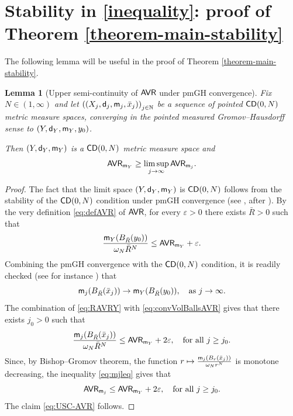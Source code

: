 \documentclass[11pt, reqno]{amsart}
\newtheorem{lemma}{Lemma}[section]
\numberwithin{equation}{section}
\begin{document}
		

 \section{Stability in \eqref{inequality}: proof of Theorem \ref{theorem-main-stability}}
	
	The following lemma will be useful in the proof of Theorem \ref{theorem-main-stability}.
	
	\begin{lemma}[Upper semi-continuity of ${\sf AVR}$ under pmGH convergence] \label{lem:USC-AVR} Fix $N\in (1,\infty)$ and let $\left((X_j, {\sf d}_j, {\sf m}_j, \bar{x}_j)\right)_{j\in \mathbb{N}}$ be a sequence of pointed  ${\sf CD}(0,N)$ metric measure  spaces, converging in the pointed measured Gromov--Hausdorff sense to $(Y, {\sf d}_{Y}, {\sf m}_{Y}, y_{0})$. 
	
	Then  $(Y, {\sf d}_{Y}, {\sf m}_{Y})$ is a ${\sf CD}(0,N)$ metric measure  space and 
	\begin{equation}\label{eq:USC-AVR}
	{\sf AVR}_{{\sf m}_Y} \geq \limsup_{j\to \infty} {\sf AVR}_{{\sf m}_j}. 
	\end{equation}
	\end{lemma}

	\begin{proof} 
	The fact that the limit space $(Y, {\sf d}_{Y}, {\sf m}_{Y})$ is ${\sf CD}(0,N)$ follows from the stability of the ${\sf CD}(0,N)$ condition under pmGH convergence (see \cite[Theorem 29.25]{Villani}, after \cite{Sturm-2, LV}).    
	By the very definition \eqref{eq:defAVR} of ${\sf AVR}$, for every $\varepsilon>0$ there exists $\bar{R}>0$ such that
	\begin{equation}\label{eq:RAVRY}
	\frac{{\sf m}_Y(B_{\bar R}(y_0))}{\omega_N {\bar R}^N}\leq  {\sf AVR}_{{\sf m}_Y}  +\varepsilon.
	\end{equation}
	Combining the pmGH convergence with the ${\sf CD}(0,N)$ condition, it is readily checked (see for instance \cite[Lemma 4.13]{MV-CVPDE}) that 
	\begin{equation}\label{eq:convVolBallsAVR}
		{\sf m}_{j}(B_{\bar R}(\bar x_{j}))\to {\sf m}_{Y}(B_{\bar R}(y_{0})), \quad \text{as } j\to \infty.
		\end{equation}
	The combination of  \eqref{eq:RAVRY} with \eqref{eq:convVolBallsAVR} gives that there exists $j_0>0$ such that
	\begin{equation}\label{eq:mjleq}
		\frac{{\sf m}_{j}(B_{\bar R}(\bar x_{j}))}{ \omega_N {\bar R}^N }\leq  {\sf AVR}_{{\sf m}_Y} + 2 \varepsilon, \quad \text{for all } j\geq j_0.
		\end{equation}
	Since, by Bishop--Gromov theorem, the function $r\mapsto \frac{{\sf m}_{j}(B_r(\bar x_{j}))}{ \omega_N r^N }$ is monotone decreasing, 	the inequality \eqref{eq:mjleq} gives that
	$$
	{\sf AVR}_{{\sf m}_j}\leq   {\sf AVR}_{{\sf m}_Y} + 2 \varepsilon, \quad \text{for all } j\geq j_0.
	$$
	The claim \eqref{eq:USC-AVR} follows.
	\end{proof}
	
\end{document}
